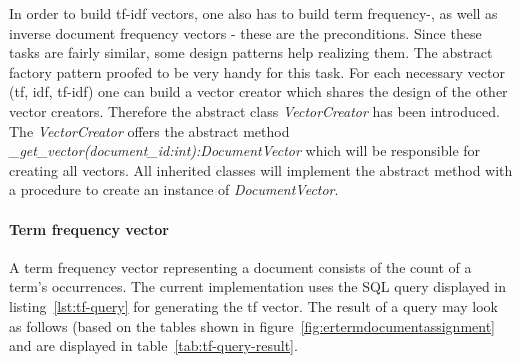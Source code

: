 In order to build tf-idf vectors, one also has to build term frequency-, as well as inverse document frequency vectors - these are the preconditions.
Since these tasks are fairly similar, some design patterns help realizing them.
The \gls{abstract factory} pattern proofed to be very handy for this task.
For each necessary vector (tf, idf, tf-idf) one can build a vector creator which shares the design of the other vector creators.
Therefore the abstract class \textit{VectorCreator} has been introduced.
The \textit{VectorCreator} offers the abstract method \textit{\_get\_vector(document\_id:int):DocumentVector} which will be responsible for creating all vectors.
All inherited classes will implement the abstract method with a procedure to create an instance of \textit{DocumentVector}.

\FloatBarrier

\paragraph{Term frequency vector}
A term frequency vector representing a document consists of the count of a term's occurrences.
The current implementation uses the SQL query displayed in listing~\ref{lst:tf-query} for generating the tf vector.
The result of a query may look as follows (based on the tables shown in figure~\ref{fig:ertermdocumentassignment} and are displayed in table~\ref{tab:tf-query-result}.

